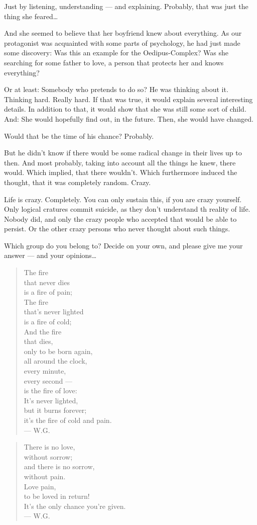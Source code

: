 Just by listening, understanding --- and explaining. 
Probably, that was just the thing she feared\ldots

And she seemed to believe that her boyfriend knew about everything. 
As our protagonist was acquainted with some parts of psychology, he had just made some discovery: Was this an example for the Oedipus-Complex? Was she searching for some father to love, a person that protects her and knows everything?

Or at least: Somebody who pretends to do so?
He was thinking about it. 
Thinking hard. 
Really hard. 
If that was true, it would explain several interesting details. 
In addition to that, it would show that she was still some sort of child. 
And: She would hopefully find out, in the future. 
Then, she would have changed.

Would that be the time of his chance?
Probably.

But he didn't know if there would be some radical change in their lives up to then. 
And most probably, taking into account all the things he knew, there would. 
Which implied, that there wouldn't. 
Which furthermore induced the thought, that it was completely random. 
Crazy.

Life is crazy. 
Completely. 
You can only sustain this, if you are crazy yourself. Only logical cratures commit suicide, as they don't understand th reality of life. 
Nobody did, and only the crazy people who accepted that would be able to persist. 
Or the other crazy persons who never thought about such things.

Which group do you belong to?
Decide on your own, and please give me your answer --- and your opinions\ldots

\begin{quote}
The fire \\
that never dies \\
is a fire of pain; \\
The fire \\
that's never lighted \\
is a fire of cold;\\
And the fire \\
that dies, \\
only to be born again, \\
all around the clock, \\
every minute, \\
every second --- \\
is the fire of love: \\
It's never lighted, \\
but it burns forever; \\
it's the fire of cold and pain. \\
--- W.G.
\end{quote}

\begin{quote}
There is no love, \\
without sorrow; \\
and there is no sorrow, \\
without pain. \\
Love pain, \\
to be loved in return! \\
It's the only chance you're given. \\
--- W.G.
\end{quote}
